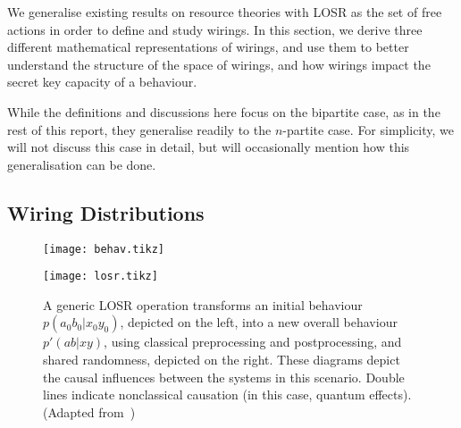 \documentclass[10pt, a4paper]{article}
\numberwithin{equation}{section} %
\theoremstyle{definition}
\theoremstyle{plain}
\newcommand{\?}{\mathrel{?}} %
\begin{document}
              We generalise existing results on resource theories with LOSR as the set of free actions in order to define and study wirings. In this section, we derive three different mathematical representations of wirings, and use them to better understand the structure of the space of wirings, and how wirings impact the secret key capacity of a behaviour.

                While the definitions and discussions here focus on the bipartite case, as in the rest of this report, they generalise readily to the \(n\)-partite case. For simplicity, we will not discuss this case in detail, but will occasionally mention how this generalisation can be done.

              \subsection{Wiring Distributions}\label{sec:locwir_dist}

              \begin{figure}
                \centering
                \begin{minipage}{0.3\linewidth}
                  \centering
                  \texttt{[image: behav.tikz]}
                \end{minipage}
                \begin{minipage}{0.6\linewidth}
                  \centering
                  \texttt{[image: losr.tikz]}
                \end{minipage}
                  \caption[Causal influences in an LOSR operation on a quantum behaviour.]{\label{fig:losr} A generic LOSR operation transforms an initial behaviour \(p(a_0 b_0|x_0 y_0)\), depicted on the left, into a new overall behaviour \(p'(ab|xy)\), using classical preprocessing and postprocessing, and shared randomness, depicted on the right. These diagrams depict the causal influences between the systems in this scenario. Double lines indicate nonclassical causation (in this case, quantum effects). (Adapted from~\cite{BellResourceTheory})}
                \end{figure}
\end{document}
